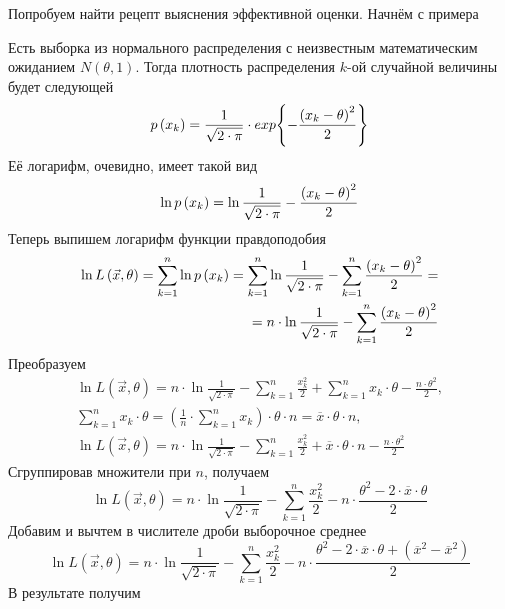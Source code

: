 Попробуем найти рецепт выяснения эффективной оценки. Начнём с примера
\begin{example}
  Есть выборка \xsample из нормального распределения
  с неизвестным математическим ожиданием $N\left( \theta,1 \right)$.
  Тогда плотность распределения $k$-ой случайной величины будет следующей
  $$p\left(x_k\right)
    = \frac{1}{\sqrt{2 \cdot \pi}}
      \cdot exp{\left\{-\frac{\left(x_k-\theta\right)^2}{2}\right\}}$$
  Её логарифм, очевидно, имеет такой вид
  $$\ln{p\left(x_k\right)}
    = \ln{\frac{1}{\sqrt{2 \cdot \pi}}}
      -\frac{\left(x_k-\theta\right)^2}{2}$$
  Теперь выпишем логарифм функции правдоподобия
  \begin{align*}
    \ln{L\left( \vec{x}, \theta \right)}
    = \sum_{k=1}^n \ln{p\left(x_k\right)}
    = \sum_{k=1}^n \ln{\frac{1}{\sqrt{2 \cdot \pi}}}
      - \sum_{k=1}^n \frac{\left(x_k - \theta \right)^2}{2} = \\
    = n \cdot \ln{\frac{1}{\sqrt{2 \cdot \pi}}}
      - \sum_{k=1}^n \frac{\left(x_k - \theta \right)^2}{2}
  \end{align*}
  Преобразуем
  \begin{align*}
    \ln{L\left( \vec{x},\theta \right)}
    = n \cdot \ln{\frac{1}{\sqrt{2 \cdot \pi}}} - \sum_{k=1}^n \frac{x_k^2}{2}
      + \sum_{k=1}^n x_k \cdot \theta - \frac{n \cdot \theta^2}{2}, \\
    \sum_{k=1}^n x_k \cdot \theta
    = \left( \frac{1}{n} \cdot \sum_{k=1}^n x_k \right) \cdot \theta \cdot n
    = \overline{x} \cdot \theta \cdot n, \\
    \ln{L\left( \vec{x}, \theta \right)}
    = n \cdot \ln{\frac{1}{\sqrt{2 \cdot \pi}}} - \sum_{k=1}^n \frac{x_k^2}{2}
      + \overline{x} \cdot \theta \cdot n - \frac{n \cdot \theta^2}{2}
  \end{align*}
  Сгруппировав множители при $n$, получаем
  \begin{equation*}
  \ln{L\left( \vec{x}, \theta \right)}
  = n \cdot \ln{\frac{1}{\sqrt{2 \cdot \pi}}} - \sum_{k=1}^n \frac{x_k^2}{2}
    - n \cdot \frac{\theta^2 - 2 \cdot \overline{x} \cdot \theta}{2}
  \end{equation*}
  Добавим и вычтем в числителе дроби выборочное среднее
  \begin{equation*}
    \ln{L\left( \vec{x},\theta \right)}
    = n \cdot \ln{\frac{1}{\sqrt{2 \cdot \pi}}} -\sum_{k=1}^n \frac{x_k^2}{2}
      - n \cdot \frac{\theta^2 - 2 \cdot \overline{x} \cdot \theta
      + \left( \overline{x}^2 - \overline{x}^2 \right)}{2}
  \end{equation*}
  В результате получим

\end{example}
